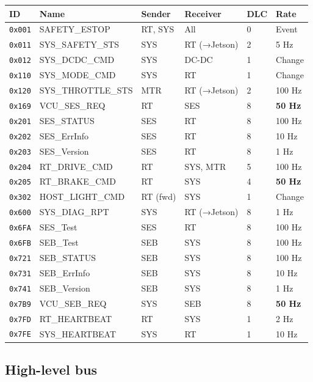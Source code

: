 \begin{longtable}[]{@{}llllll@{}}
\toprule\noalign{}
ID & Name & Sender & Receiver & DLC & Rate \\
\midrule\noalign{}
\endhead
\bottomrule\noalign{}
\endlastfoot
\texttt{0x001} & SAFETY\_ESTOP & RT, SYS & All & 0 & Event \\
\texttt{0x011} & SYS\_SAFETY\_STS & SYS & RT (→Jetson) & 2 & 5 Hz \\
\texttt{0x012} & SYS\_DCDC\_CMD & SYS & DC-DC & 1 & Change \\
\texttt{0x110} & SYS\_MODE\_CMD & SYS & RT & 1 & Change \\
\texttt{0x120} & SYS\_THROTTLE\_STS & MTR & RT (→Jetson) & 2 & 100 Hz \\
\texttt{0x169} & VCU\_SES\_REQ & RT & SES & 8 & \textbf{50 Hz} \\
\texttt{0x201} & SES\_STATUS & SES & RT & 8 & 100 Hz \\
\texttt{0x202} & SES\_ErrInfo & SES & RT & 8 & 10 Hz \\
\texttt{0x203} & SES\_Version & SES & RT & 8 & 1 Hz \\
\texttt{0x204} & RT\_DRIVE\_CMD & RT & SYS, MTR & 5 & 100 Hz \\
\texttt{0x205} & RT\_BRAKE\_CMD & RT & SYS & 4 & \textbf{50 Hz} \\
\texttt{0x302} & HOST\_LIGHT\_CMD & RT (fwd) & SYS & 1 & Change \\
\texttt{0x600} & SYS\_DIAG\_RPT & SYS & RT (→Jetson) & 8 & 1 Hz \\
\texttt{0x6FA} & SES\_Test & SES & RT & 8 & 100 Hz \\
\texttt{0x6FB} & SEB\_Test & SEB & SYS & 8 & 100 Hz \\
\texttt{0x721} & SEB\_STATUS & SEB & SYS & 8 & 100 Hz \\
\texttt{0x731} & SEB\_ErrInfo & SEB & SYS & 8 & 10 Hz \\
\texttt{0x741} & SEB\_Version & SEB & SYS & 8 & 1 Hz \\
\texttt{0x7B9} & VCU\_SEB\_REQ & SYS & SEB & 8 & \textbf{50 Hz} \\
\texttt{0x7FD} & RT\_HEARTBEAT & RT & SYS & 1 & 2 Hz \\
\texttt{0x7FE} & SYS\_HEARTBEAT & SYS & RT & 1 & 10 Hz \\
\end{longtable}

\subsection{High-level bus}\label{high-level-bus}

